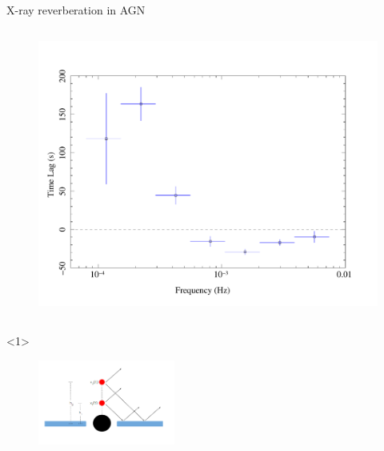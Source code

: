 \documentclass[]{beamer}
\begin{document}
\begin{frame}
[t]{X-ray reverberation in AGN}
    \begin{columns}%
        \begin{column}{.45\textwidth}
            \begin{minipage}{\textwidth}
                \begin{figure}
                \colorbox{white}{\includegraphics[scale=0.16]{1H0707-495_lagfreq_fullycomb.pdf}}\\~\\
                \end{figure}
            \end{minipage}  
            \begin{onlyenv}<1>
                \begin{minipage}{\textwidth}
                    \begin{figure}\centering
                    \colorbox{white}{\includegraphics[width=4.5cm]{2bm.png}}
                    \end{figure}
                \end{minipage}
            \end{onlyenv}

\end{column}
\end{columns}
\end{frame}
\end{document}
